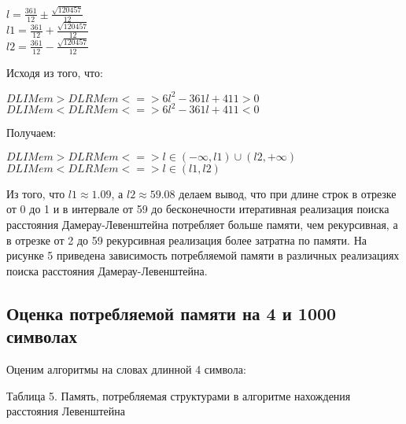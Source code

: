 \documentclass[a4paper, 14pt]{article}
\begin{document}
\begin{center}
\begin{flushleft}
\begin{flushleft}
\begin{center}
		$l = \frac{361}{12} \pm \frac{\sqrt{120457}}{12}$ \\
		$l1 = \frac{361}{12} + \frac{\sqrt{120457}}{12}$ \\
		$l2 = \frac{361}{12} - \frac{\sqrt{120457}}{12}$ \\
		\begin{flushleft}
		Исходя из того, что:\\
		\end{flushleft}
		$DLIMem > DLRMem <=> 6l^2 - 361l + 411 > 0$\\
		$DLIMem < DLRMem <=> 6l^2 - 361l + 411 < 0$\\
		\begin{flushleft}
		Получаем:\\
		\end{flushleft}		
		$DLIMem > DLRMem <=> l \in (-\infty, l1) \cup (l2, +\infty)$\\
		$DLIMem < DLRMem <=> l \in (l1, l2)$
		\end{center}
		\begin{flushleft}
		Из того, что $l1 \approx 1.09$, а $l2 \approx 59.08$ делаем вывод, что при длине строк в отрезке от 0 до 1  и в интервале от 59 до бесконечности итеративная реализация поиска расстояния Дамерау-Левенштейна потребляет больше памяти, чем рекурсивная, а в отрезке от 2 до 59 рекурсивная реализация более затратна по памяти. На рисунке 5 приведена зависимость потребляемой памяти в различных реализациях поиска расстояния Дамерау-Левенштейна.
		\end{flushleft}
  \end{flushleft}

	\subsection{Оценка потребляемой памяти на 4 и 1000 символах}	
	Оценим алгоритмы на словах длинной 4 символа:\\

	\begin{center}
	Таблица 5. Память, потребляемая структурами в алгоритме нахождения расстояния Левенштейна\\
	\end{center}
	
	


\end{flushleft}
\end{center}
\end{document}
